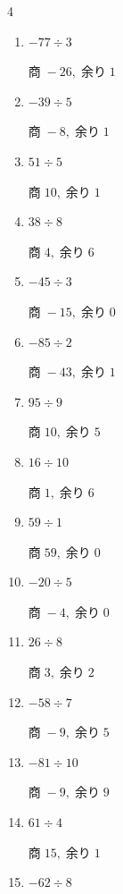 \begin{multicols}{4}
\begin{enumerate}
  \item $-77 \div 3$

        $商\; -26,\; 余り\; 1$

  \item $-39 \div 5$

        $商\; -8,\; 余り\; 1$

  \item $51 \div 5$

        $商\; 10,\; 余り\; 1$

  \item $38 \div 8$

        $商\; 4,\; 余り\; 6$

  \item $-45 \div 3$

        $商\; -15,\; 余り\; 0$

  \item $-85 \div 2$

        $商\; -43,\; 余り\; 1$

  \item $95 \div 9$

        $商\; 10,\; 余り\; 5$

  \item $16 \div 10$

        $商\; 1,\; 余り\; 6$

  \item $59 \div 1$

        $商\; 59,\; 余り\; 0$

  \item $-20 \div 5$

        $商\; -4,\; 余り\; 0$

\columnbreak %

\resetques

  \item $26 \div 8$

        $商\; 3,\; 余り\; 2$

  \item $-58 \div 7$

        $商\; -9,\; 余り\; 5$

  \item $-81 \div 10$

        $商\; -9,\; 余り\; 9$

  \item $61 \div 4$

        $商\; 15,\; 余り\; 1$

  \item $-62 \div 8$


\end{enumerate}
\end{multicols}
